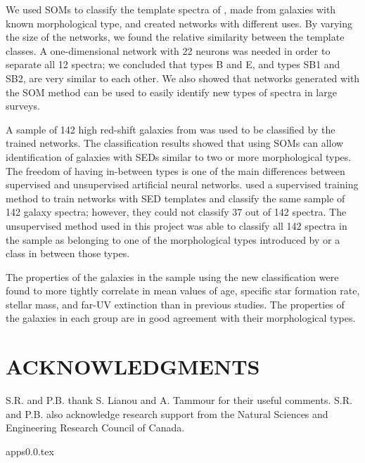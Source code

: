 \documentclass[useAMS,usenatbib]{mn2e}
\begin{document}
We used SOMs to classify the template spectra of , made from galaxies with known morphological type, and created networks with different uses.
By varying the size of the networks, we found the relative similarity between the  template classes.
A one-dimensional network with 22 neurons was needed in order to
separate all 12  spectra; we concluded that  types B and E, and types SB1 and SB2, are very similar to each other.
We also showed that networks generated with the SOM method can be used to easily identify new types of spectra in large surveys.

A sample of 142 high red-shift galaxies from  was used to be classified by the trained networks.
The classification results showed that using SOMs can allow identification of galaxies with SEDs similar to two or more morphological types.
The freedom of having in-between types is one of the main differences between supervised and unsupervised artificial neural networks.
 used a supervised training method to train networks with  SED templates and classify the same sample of 142 galaxy spectra;
however, they could not classify 37 out of 142 spectra.
The unsupervised method used in this project was able to classify  all 142 spectra in the sample
as belonging to one of the morphological types introduced by  or a class in between those types.

The properties of the galaxies in the  sample using the new classification were found to more tightly correlate in mean values of age, specific star formation rate, stellar mass, and far-UV extinction than in previous studies. 
The properties of the galaxies in each group are in good agreement with their morphological types.

\section*{ACKNOWLEDGMENTS}
S.R. and P.B. thank S. Lianou and A. Tammour for their useful comments. 
S.R. and P.B. also acknowledge research support from the Natural Sciences and Engineering Research Council of Canada. 



{apps0.0.tex}
\end{document}
